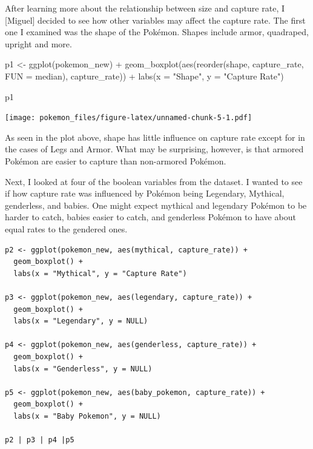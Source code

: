 \documentclass[
]{article}
\newenvironment{Shaded}{\begin{snugshade}}{\end{snugshade}}
\newcommand{\AttributeTok}[1]{\textcolor[rgb]{0.77,0.63,0.00}{#1}}
\newcommand{\FunctionTok}[1]{\textcolor[rgb]{0.00,0.00,0.00}{#1}}
\newcommand{\NormalTok}[1]{#1}
\newcommand{\OtherTok}[1]{\textcolor[rgb]{0.56,0.35,0.01}{#1}}
\newcommand{\SpecialCharTok}[1]{\textcolor[rgb]{0.00,0.00,0.00}{#1}}
\newcommand{\StringTok}[1]{\textcolor[rgb]{0.31,0.60,0.02}{#1}}
\begin{document}
After learning more about the relationship between size and capture
rate, I {[}Miguel{]} decided to see how other variables may affect the
capture rate. The first one I examined was the shape of the Pokémon.
Shapes include armor, quadraped, upright and more.

\begin{Shaded}
\begin{Highlighting}[]
\NormalTok{p1 }\OtherTok{\textless{}{-}} \FunctionTok{ggplot}\NormalTok{(pokemon\_new) }\SpecialCharTok{+}
  \FunctionTok{geom\_boxplot}\NormalTok{(}\FunctionTok{aes}\NormalTok{(}\FunctionTok{reorder}\NormalTok{(shape, capture\_rate, }\AttributeTok{FUN =}\NormalTok{ median), capture\_rate)) }\SpecialCharTok{+}
  \FunctionTok{labs}\NormalTok{(}\AttributeTok{x =} \StringTok{"Shape"}\NormalTok{, }\AttributeTok{y =} \StringTok{"Capture Rate"}\NormalTok{)}

\NormalTok{p1}
\end{Highlighting}
\end{Shaded}

\texttt{[image: pokemon\_files/figure-latex/unnamed-chunk-5-1.pdf]}

As seen in the plot above, shape has little influence on capture rate
except for in the cases of Legs and Armor. What may be surprising,
however, is that armored Pokémon are easier to capture than non-armored
Pokémon.

Next, I looked at four of the boolean variables from the dataset. I
wanted to see if how capture rate was influenced by Pokémon being
Legendary, Mythical, genderless, and babies. One might expect mythical
and legendary Pokémon to be harder to catch, babies easier to catch, and
genderless Pokémon to have about equal rates to the gendered ones.

\begin{verbatim}
p2 <- ggplot(pokemon_new, aes(mythical, capture_rate)) + 
  geom_boxplot() +
  labs(x = "Mythical", y = "Capture Rate")

p3 <- ggplot(pokemon_new, aes(legendary, capture_rate)) + 
  geom_boxplot() +
  labs(x = "Legendary", y = NULL)

p4 <- ggplot(pokemon_new, aes(genderless, capture_rate)) + 
  geom_boxplot() +
  labs(x = "Genderless", y = NULL)

p5 <- ggplot(pokemon_new, aes(baby_pokemon, capture_rate)) + 
  geom_boxplot() +
  labs(x = "Baby Pokemon", y = NULL)

p2 | p3 | p4 |p5
  
\end{verbatim}
\end{document}
